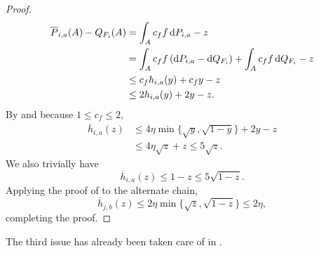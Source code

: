 \begin{proof}
	\begin{align*}
		\overline{P}_{i,a}(A) - Q_{F_i}(A) &= \int_A c_f f \operatorname{d}\!{P}_{i,a} - z \\
			&= \int_A c_f f \left(\operatorname{d}\!{P}_{i,a} - \operatorname{d}\!{Q}_{F_i}\right) + \int_A c_f f \operatorname{d}\!{Q}_{F_i} - z \\
			&\leq c_f h_{i,a}(y) + c_f y - z \\
			&\leq 2 h_{i,a}(y) + 2 y - z. 
	\end{align*}
	By  and because $1\leq c_f\leq 2$,
	\begin{align*}
		\overline{h}_{i,a}(z) &\leq 4\eta\min\{\sqrt{y},\sqrt{1-y}\} + 2y - z \\
			&\leq 4\eta\sqrt{z} + z \leq 5\sqrt{z}.
	\end{align*}
	We also trivially have
	\[ \overline{h}_{i,a}(z) \leq 1-z \leq 5\sqrt{1-z}. \]
	Applying the proof of  to the alternate chain,
	\[ \overline{h}_{j,b}(z) \leq 2\eta\min\{\sqrt{z},\sqrt{1-z}\} \leq 2\eta, \]
	completing the proof.
\end{proof}

The third issue has already been taken care of in .\\


